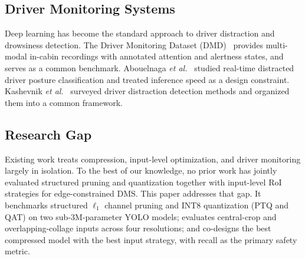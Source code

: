 \documentclass[conference]{IEEEtran}
\begin{document}
\subsection{Driver Monitoring Systems}
Deep learning has become the standard approach to driver distraction and drowsiness detection. The Driver Monitoring Dataset (DMD)~\cite{b20} provides multi-modal in-cabin recordings with annotated attention and alertness states, and serves as a common benchmark. Abouelnaga \emph{et al.}\ \cite{b21} studied real-time distracted driver posture classification and treated inference speed as a design constraint. Kashevnik \emph{et al.}\ \cite{b22} surveyed driver distraction detection methods and organized them into a common framework. 
\subsection{Research Gap}
Existing work treats compression, input-level optimization, and driver monitoring largely in isolation. To the best of our knowledge, no prior work has jointly evaluated structured pruning and quantization together with input-level RoI strategies for edge-constrained DMS. This paper addresses that gap. It benchmarks structured $\ell_1$ channel pruning and INT8 quantization (PTQ and QAT) on two sub-3M-parameter YOLO models; evaluates central-crop and overlapping-collage inputs across four resolutions; and co-designs the best compressed model with the best input strategy, with recall as the primary safety metric.
\end{document}
